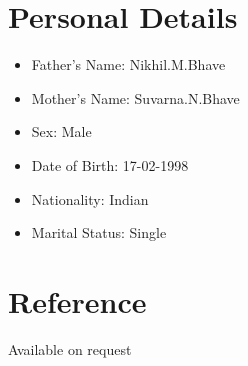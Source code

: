 \documentclass[margin,line]{res}
\begin{document}
\begin{resume}
\section{\sc Personal Details}
\begin{itemize}
	\item Father's Name: Nikhil.M.Bhave
	\item Mother's Name: Suvarna.N.Bhave
	\item Sex: Male
	\item Date of Birth: 17-02-1998
	\item Nationality: Indian
	\item Marital Status: Single
\end{itemize}

\section{\sc Reference}
Available on request

\end{resume}
\end{document}
